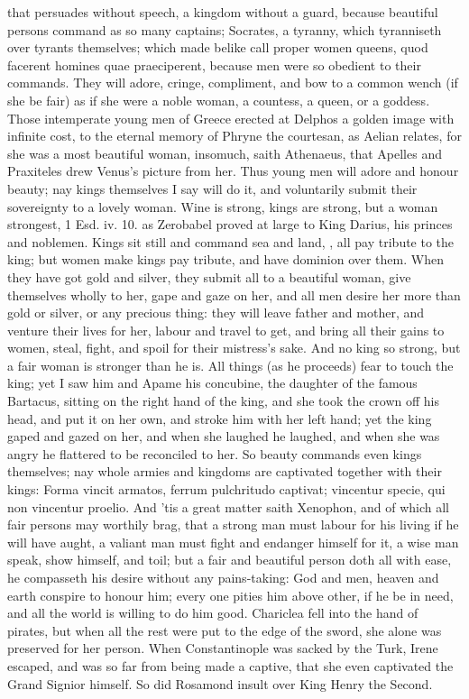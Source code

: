 that persuades without speech, a kingdom without a guard, because
beautiful persons command as so many captains; Socrates, a tyranny,
which tyranniseth over tyrants themselves; which made \Diogenes belike
call proper women queens, quod facerent homines quae praeciperent,
because men were so obedient to their commands. They will adore,
cringe, compliment, and bow to a common wench (if she be fair) as if
she were a noble woman, a countess, a queen, or a goddess. Those
intemperate young men of Greece erected at Delphos a golden image with
infinite cost, to the eternal memory of Phryne the courtesan, as Aelian
relates, for she was a most beautiful woman, insomuch, saith
Athenaeus, that Apelles and Praxiteles drew Venus's picture from
her. Thus young men will adore and honour beauty; nay kings themselves
I say will do it, and voluntarily submit their sovereignty to a lovely
woman. Wine is strong, kings are strong, but a woman strongest, 1 Esd.
iv. 10. as Zerobabel proved at large to King Darius, his princes and
noblemen. Kings sit still and command sea and land, \etc{}, all pay
tribute to the king; but women make kings pay tribute, and have
dominion over them. When they have got gold and silver, they submit all
to a beautiful woman, give themselves wholly to her, gape and gaze on
her, and all men desire her more than gold or silver, or any precious
thing: they will leave father and mother, and venture their lives for
her, labour and travel to get, and bring all their gains to women,
steal, fight, and spoil for their mistress's sake. And no king so
strong, but a fair woman is stronger than he is. All things (as
he proceeds) fear to touch the king; yet I saw him and Apame his
concubine, the daughter of the famous Bartacus, sitting on the right
hand of the king, and she took the crown off his head, and put it on
her own, and stroke him with her left hand; yet the king gaped and
gazed on her, and when she laughed he laughed, and when she was angry
he flattered to be reconciled to her. So beauty commands even kings
themselves; nay whole armies and kingdoms are captivated together with
their kings: Forma vincit armatos, ferrum pulchritudo captivat;
vincentur specie, qui non vincentur proelio. And 'tis a great matter
saith Xenophon, and of which all fair persons may worthily brag,
that a strong man must labour for his living if he will have aught, a
valiant man must fight and endanger himself for it, a wise man speak,
show himself, and toil; but a fair and beautiful person doth all with
ease, he compasseth his desire without any pains-taking: God and men,
heaven and earth conspire to honour him; every one pities him above
other, if he be in need, and all the world is willing to do him
good. Chariclea fell into the hand of pirates, but when all the
rest were put to the edge of the sword, she alone was preserved for her
person. When Constantinople was sacked by the Turk, Irene
escaped, and was so far from being made a captive, that she even
captivated the Grand Signior himself. So did Rosamond insult over King
Henry the Second.

